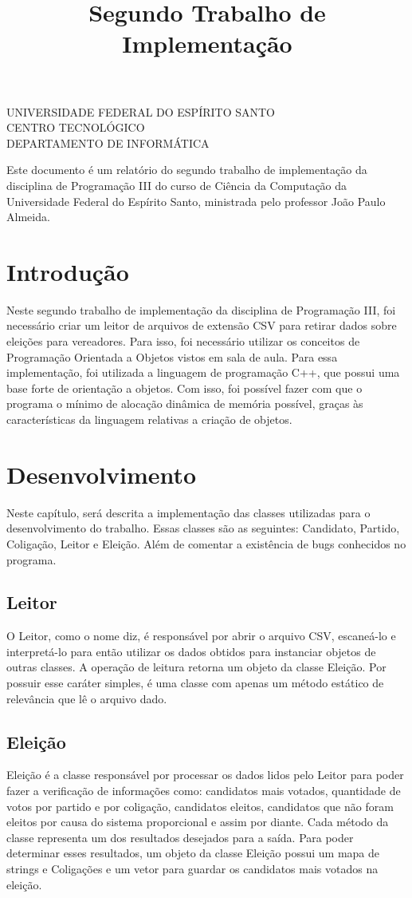 \documentclass[oneside]{abntex2}
\title{Segundo Trabalho de Implementação}
\renewcommand{\imprimircapa}{
	\begin{capa}
		\center

		\ABNTEXchapterfont\large UNIVERSIDADE FEDERAL DO ESPÍRITO SANTO \\ CENTRO TECNOLÓGICO \\ DEPARTAMENTO DE INFORMÁTICA

		\vfill
		\begin{center}
		\ABNTEXchapterfont\bfseries\LARGE\imprimirtitulo
		\end{center}
		\vfill

		\ABNTEXchapterfont\large\imprimirautor
		\vfill

		\large\imprimirlocal

		\large\imprimirdata

		\vspace*{1cm}
	\end{capa}
}
\begin{document}
	\imprimircapa
	\imprimirfolhaderosto

	\begin{resumo}
	Este documento é um relatório do segundo trabalho de implementação da disciplina de Programação III do curso de Ciência da Computação da Universidade Federal do Espírito Santo, ministrada pelo professor João Paulo Almeida.
	\end{resumo}

	\tableofcontents
	\newpage

	\textual

	\chapter*{Introdução}
Neste segundo trabalho de implementação da disciplina de Programação III, foi necessário criar um leitor de arquivos de extensão CSV para retirar dados sobre eleições para vereadores. Para isso, foi necessário utilizar os conceitos de Programação Orientada a Objetos vistos em sala de aula. Para essa implementação, foi utilizada a linguagem de programação C++, que possui uma base forte de orientação a objetos. Com isso, foi possível fazer com que o programa o mínimo de alocação dinâmica de memória possível, graças às características da linguagem relativas a criação de objetos.

    \newpage
    \chapter{Desenvolvimento}
Neste capítulo, será descrita a implementação das classes utilizadas para o desenvolvimento do trabalho. Essas classes são as seguintes: Candidato, Partido, Coligação, Leitor e Eleição. Além de comentar a existência de bugs conhecidos no programa.

	\section{Leitor}
O Leitor, como o nome diz, é responsável por abrir o arquivo CSV, escaneá-lo e interpretá-lo para então utilizar os dados obtidos para instanciar objetos de outras classes. A operação de leitura retorna um objeto da classe Eleição. Por possuir esse caráter simples, é uma classe com apenas um método estático de relevância que lê o arquivo dado.

	\section{Eleição}
Eleição é a classe responsável por processar os dados lidos pelo Leitor para poder fazer a verificação de informações como: candidatos mais votados, quantidade de votos por partido e por coligação, candidatos eleitos, candidatos que não foram eleitos por causa do sistema proporcional e assim por diante. Cada método da classe representa um dos resultados desejados para a saída. Para poder determinar esses resultados, um objeto da classe Eleição possui um mapa de strings e Coligações e um vetor para guardar os candidatos mais votados na eleição.
\end{document}
